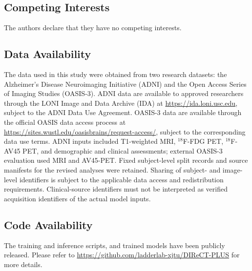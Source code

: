 \documentclass{article}
\begin{document}
\subsection*{Competing Interests}
The authors declare that they have no competing interests.

\subsection*{Data Availability}
The data used in this study were obtained from two research datasets: the Alzheimer's Disease Neuroimaging Initiative (ADNI) and the Open Access Series of Imaging Studies (OASIS-3). ADNI data are available to approved researchers through the LONI Image and Data Archive (IDA) at \url{https://ida.loni.usc.edu}, subject to the ADNI Data Use Agreement. OASIS-3 data are available through the official OASIS data access process at \url{https://sites.wustl.edu/oasisbrains/request-access/}, subject to the corresponding data use terms. ADNI inputs included T1-weighted MRI, $^{18}$F-FDG PET, $^{18}$F-AV45 PET, and demographic and clinical assessments; external OASIS-3 evaluation used MRI and AV45-PET. Fixed subject-level split records and source manifests for the revised analyses were retained. Sharing of subject- and image-level identifiers is subject to the applicable data access and redistribution requirements. Clinical-source identifiers must not be interpreted as verified acquisition identifiers of the actual model inputs.

\subsection*{Code Availability}
The training and inference scripts, and trained models have been publicly released. Please refer to \url{https://github.com/ladderlab-xjtu/DIReCT-PLUS} for more details.

\printbibliography
\end{document}
